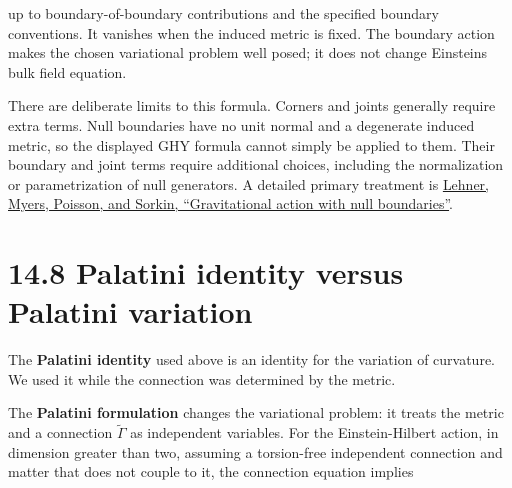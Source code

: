 \documentclass[
  11pt,
  letterpaper,
  oneside,
  openany]{scrbook}
\begin{document}
\begin{center}
\begingroup
{}
\ifdim\wd\grmathbox>\linewidth
\resizebox{\linewidth}{!}{\usebox{\grmathbox}}
\else\usebox{\grmathbox}\fi
\endgroup
\end{center}

up to boundary-of-boundary contributions and the specified boundary
conventions. It vanishes when the induced metric is fixed. The boundary
action makes the chosen variational problem well posed; it does not
change Einstein\textquotesingle s bulk field equation.

There are deliberate limits to this formula. Corners and joints
generally require extra terms. Null boundaries have no unit normal and a
degenerate induced metric, so the displayed GHY formula cannot simply be
applied to them. Their boundary and joint terms require additional
choices, including the normalization or parametrization of null
generators. A detailed primary treatment is
\href{https://arxiv.org/abs/1609.00207}{Lehner, Myers, Poisson, and
Sorkin, ``Gravitational action with null boundaries''}.

\hypertarget{palatini-identity-versus-palatini-variation}{%
\section{14.8 Palatini identity versus Palatini
variation}\label{palatini-identity-versus-palatini-variation}}

The \textbf{Palatini identity} used above is an identity for the
variation of curvature. We used it while the connection was determined
by the metric.

The \textbf{Palatini formulation} changes the variational problem: it
treats the metric and a connection \(\widetilde\Gamma\) as independent
variables. For the Einstein-Hilbert action, in dimension greater than
two, assuming a torsion-free independent connection and matter that does
not couple to it, the connection equation implies

\begin{center}
\begingroup
{}
\ifdim\wd\grmathbox>\linewidth
\resizebox{\linewidth}{!}{\usebox{\grmathbox}}
\else\usebox{\grmathbox}\fi
\endgroup
\end{center}
\end{document}
